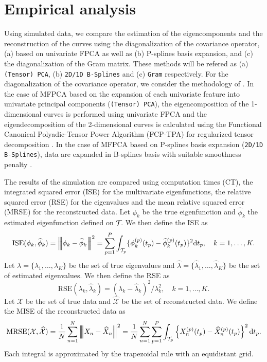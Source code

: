 \section{Empirical analysis} %
\label{sec:empirical_analysis}


Using simulated data, we compare the estimation of the eigencomponents and the reconstruction of the curves using the diagonalization of the covariance operator, (a) based on univariate FPCA as well as (b) P-splines basis expansion, and (c) the diagonalization of the Gram matrix. These methods will be refered as (a) \texttt{(Tensor) PCA}, (b) \texttt{2D/1D B-Splines} and (c) \texttt{Gram} respectively. For the diagonalization of the covariance operator, we consider the methodology of \cite{happMultivariateFunctionalPrincipal2018a}. In the case of MFPCA based on the expansion of each univariate feature into univariate principal components (\texttt{(Tensor) PCA}), the eigencomposition of the 1-dimensional curves is performed using univariate FPCA and the eigendecomposition of the 2-dimensional curves is calculated using the Functional Canonical Polyadic-Tensor Power Algorithm (FCP-TPA) for regularized tensor decomposition \citep{allenMultiwayFunctionalPrincipal2013a}. In the case of MFPCA based on P-splines basis expansion (\texttt{2D/1D B-Splines}), data are expanded in B-splines basis with suitable smoothness penalty \citep{eilersFlexibleSmoothingBsplines1996}.

The results of the simulation are compared using computation times (CT), the integrated squared error (ISE) for the multivariate eigenfunctions, the relative squared error (RSE) for the eigenvalues and the mean relative squared error (MRSE) for the reconstructed data. Let $\phi_k$ be the true eigenfunction and $\widehat{\phi}_k$ the estimated eigenfunction defined on $\mathcal{T}_{}$. We then define the ISE as 
\begin{equation}\label{eq:ise_eigenfunctions}
    \text{ISE}(\phi_k, \widehat{\phi}_k) = \left|\!\left|\!\left|\phi_k - \widehat{\phi}_k\right|\!\right|\!\right|^2 = \sum_{p = 1}^P \int_{\mathcal{T}_{p}} \{\phi^{(p)}_k(t_p) - \widehat{\phi}^{(p)}_k(t_p)\}^2 {\rm d} t_p, \quad k = 1, \dots, K.
\end{equation}
Let $\lambda = \{\lambda_1, \dots, \lambda_K\}$ be the set of true eigenvalues and $\widehat{\lambda} = \{\widehat{\lambda}_1, \dots, \widehat{\lambda}_K\}$ be the set of estimated eigenvalues. We then define the RSE as 
\begin{equation}\label{eq:mse_eigenvalues}
    \text{RSE}(\lambda_k, \widehat{\lambda}_k) = \left(\lambda_k - \widehat{\lambda}_k\right)^2 / \lambda_k^2, \quad k = 1, \dots, K.
\end{equation}
Let $\mathcal{X}$ be the set of true data and $\widehat{\mathcal{X}}$ be the set of reconstructed data. We define the MISE of the reconstructed data as
\begin{equation}\label{eq:mise_reconstructed_data}
    \text{MRSE}(\mathcal{X}, \widehat{\mathcal{X}}) = \frac{1}{N}\sum_{n = 1}^N \left|\!\left|\!\left|X_n - \widehat{X}_n\right|\!\right|\!\right|^2 = \frac{1}{N}\sum_{n = 1}^N \sum_{p = 1}^P \int_{\mathcal{T}_{p}} \left\{X_n^{(p)}(t_p) - \widehat{X}_n^{(p)}(t_p) \right\}^2 {\rm d} t_p.
\end{equation}
Each integral is approximated by the trapezoidal rule with an equidistant grid.

